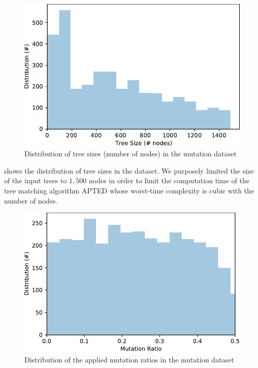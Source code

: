 \documentclass{vldb}
\begin{document}
\begin{figure}
    \centering
    \includegraphics[width=\linewidth]{graphs/tree_size_distribution}
    \caption{Distribution of tree sizes (number of nodes) in the mutation dataset}
    \label{fig:distribution_size}
\end{figure}

 shows the distribution of tree sizes in the dataset.
We purposely limited the size of the input trees to $1,500$ nodes in order to limit the computation time of the tree matching algorithm APTED whose worst-time complexity is cubic with the number of nodes.

\begin{figure}
    \centering
    \includegraphics[width=\linewidth]{graphs/mutation_ratio_distribution}
    \caption{Distribution of the applied mutation ratios in the mutation dataset}
    \label{fig:distribution_mutation_ratio}
\end{figure}
\end{document}
